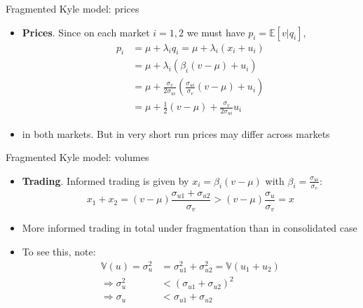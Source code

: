 \documentclass[english,10pt
,aspectratio=169
]{beamer}
\begin{document}
\begin{frame}{Fragmented Kyle model: prices}
	\begin{itemize}
		\item \textbf{Prices}.  Since on each market $i=1,2$ we must have $p_i=\mathbb{E}[v|q_i]$,
			\begin{align*}
				p_i &= \mu + \lambda_i q_i = \mu + \lambda_i (x_i + u_i)
				\\
				&= \mu + \lambda_i (\beta_i(v-\mu) + u_i)
				\\
				&= \mu + \frac{\sigma_v}{2 \sigma_{ui}} \left( \frac{\sigma_{ui}}{\sigma_v} (v-\mu) + u_i \right)
				\\
				&= \mu + \frac{1}{2}(v-\mu)+\frac{\sigma_v}{2\sigma_{ui}}u_i
			\end{align*}
		
		\item {} in both markets. But in very short run prices may differ across markets
	\end{itemize}
\end{frame}


\begin{frame}{Fragmented Kyle model: volumes}
	\begin{itemize}
		\item \textbf{Trading}. Informed trading is given by $x_i= \beta_i (v-\mu)$ with $\beta_i= \frac{\sigma_{ui}}{\sigma_{v}}$:
		\[
			x_1+x_2 = (v-\mu)\frac{\sigma_{u1}+\sigma_{u2}}{\sigma_v} 
			> 
			(v-\mu)\frac{\sigma_{u}}{\sigma_v} = x
		\]
		
		\item \alert{More informed trading} in total under fragmentation than in consolidated case
		
		\item To see this, note: 
		\begin{align*}
			\mathbb{V}(u) = \sigma_u^2 &= \sigma_{u1}^2 + \sigma_{u2}^2 = \mathbb{V}(u_1+u_2)
			\\
			\Rightarrow
			\sigma_u^2 &< (\sigma_{u1} + \sigma_{u2})^2
			\\
			\Rightarrow
			\sigma_u &< \sigma_{u1} + \sigma_{u2}
		\end{align*}
	\end{itemize}
\end{frame}
\end{document}
